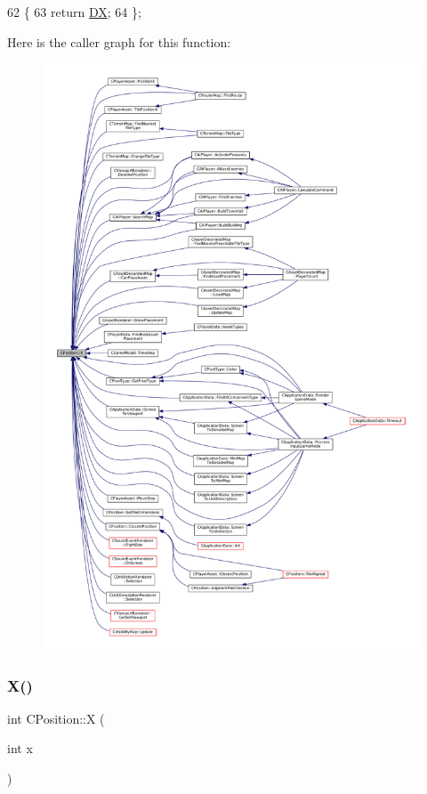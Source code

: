 \begin{DoxyCode}
62                      \{
63             \textcolor{keywordflow}{return} \hyperlink{classCPosition_a28445f9b872169715919074d82044eda}{DX};  
64         \};
\end{DoxyCode}
Here is the caller graph for this function\+:\nopagebreak
\begin{figure}[H]
\begin{center}
\leavevmode
\includegraphics[width=350pt]{classCPosition_a9a6b94d3b91df1492d166d9964c865fc_icgraph}
\end{center}
\end{figure}
\hypertarget{classCPosition_abcbbd0f2a24118ff32560150c967b1da}{}\label{classCPosition_abcbbd0f2a24118ff32560150c967b1da} 
\subsubsection{\texorpdfstring{X()}{X()}\hspace{0.1cm}{\footnotesize\ttfamily [2/2]}}
{\footnotesize\ttfamily int C\+Position\+::X (\begin{DoxyParamCaption}\item[{int}]{x }\end{DoxyParamCaption})\hspace{0.3cm}{\ttfamily [inline]}}



